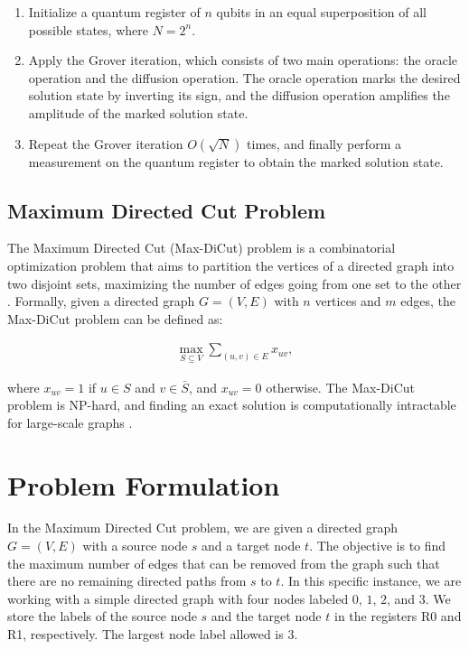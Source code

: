 \begin{enumerate}
    \item Initialize a quantum register of $n$ qubits in an equal superposition of all possible states, where $N = 2^n$.
    
    \item Apply the Grover iteration, which consists of two main operations: the oracle operation and the diffusion operation. The oracle operation marks the desired solution state by inverting its sign, and the diffusion operation amplifies the amplitude of the marked solution state.
    
    \item Repeat the Grover iteration $O(\sqrt{N})$ times, and finally perform a measurement on the quantum register to obtain the marked solution state.
\end{enumerate}

\subsection{Maximum Directed Cut Problem}

The Maximum Directed Cut (Max-DiCut) problem is a combinatorial optimization problem that aims to partition the vertices of a directed graph into two disjoint sets, maximizing the number of edges going from one set to the other \cite{maxDiCutApplications}. Formally, given a directed graph $G = (V, E)$ with $n$ vertices and $m$ edges, the Max-DiCut problem can be defined as:

\begin{align}
    \max_{S \subseteq V} \sum_{(u, v) \in E} x_{uv},
\end{align}

where $x_{uv} = 1$ if $u \in S$ and $v \in \bar{S}$, and $x_{uv} = 0$ otherwise. The Max-DiCut problem is NP-hard, and finding an exact solution is computationally intractable for large-scale graphs \cite{maxDiCutNP}.


\section{Problem Formulation}

In the Maximum Directed Cut problem, we are given a directed graph $G=(V,E)$ with a source node $s$ and a target node $t$. The objective is to find the maximum number of edges that can be removed from the graph such that there are no remaining directed paths from $s$ to $t$. In this specific instance, we are working with a simple directed graph with four nodes labeled $0$, $1$, $2$, and $3$. We store the labels of the source node $s$ and the target node $t$ in the registers R0 and R1, respectively. The largest node label allowed is $3$.


